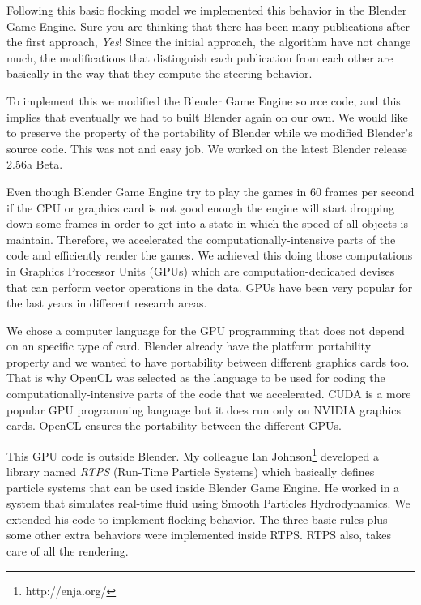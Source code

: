 Following this basic flocking model we implemented this behavior in the Blender Game Engine. Sure you are thinking that there has been many publications after the first approach, \textit{Yes}!  Since the initial approach, the algorithm have not change much, the modifications that distinguish each publication from each other are basically in the way that they compute the steering behavior.

To implement this we modified the Blender Game Engine source code, and this implies that eventually we had to built Blender again on our own. We would like to preserve the property of the portability of Blender while we modified Blender's source code. This was not and easy job. We worked on the latest Blender release 2.56a Beta. 


Even though Blender Game Engine try to play the games in 60 frames per second\cite{bookGameKit2} if the CPU or graphics card is not good enough the engine will start dropping down some frames in order to get into a state in which the speed of all objects is maintain. Therefore, we accelerated the computationally-intensive parts of the code and efficiently render the games. We achieved this doing those computations in Graphics Processor Units (GPUs) which are computation-dedicated devises that can perform vector operations in the data. GPUs have been very popular for the last years in different research areas. 

We chose a computer language for the GPU programming that does not depend on an specific type of card. Blender already have the platform portability property  and we wanted to have portability between different graphics cards too. That is why OpenCL was selected as the language to be used for coding the computationally-intensive parts of the code that we accelerated. CUDA is a more popular GPU programming language but it does run only on NVIDIA graphics cards. OpenCL ensures the portability between the different GPUs.


This GPU code is outside Blender. My colleague Ian Johnson\footnote{http://enja.org/} developed a library named \textit{RTPS} (Run-Time Particle Systems) which basically defines particle systems that can be used inside Blender Game Engine. He worked in a system that simulates real-time fluid using Smooth Particles Hydrodynamics. We extended his code to implement flocking behavior. The three basic rules plus some other extra behaviors were implemented inside RTPS. RTPS also, takes care of all the rendering.

